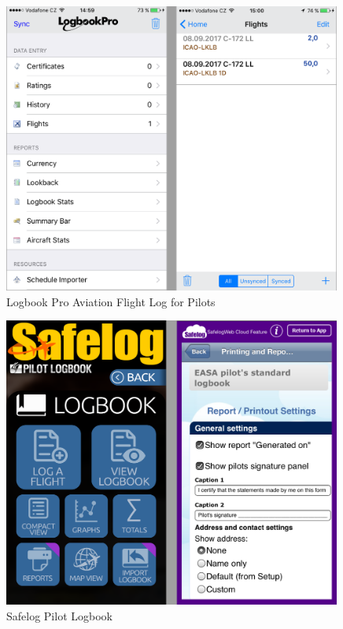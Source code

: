 \documentclass[thesis=M,czech]{FITthesis}[2012/06/26]
\begin{document}
\begin{figure}[]\centering
 \includegraphics[width=0.99\textwidth]{./pictures/existujiciAplikace/LogbookPro}
 \caption[Logbook Pro Aviation Flight Log for Pilots]{Logbook Pro Aviation Flight Log for Pilots}\label{fig:LogbookPro}
\end{figure}

\begin{figure}[]\centering
 \includegraphics[width=0.99\textwidth]{./pictures/existujiciAplikace/Safelog}
 \caption[Safelog Pilot Logbook ]{Safelog Pilot Logbook }\label{fig:Safelog}
\end{figure}
\end{document}
